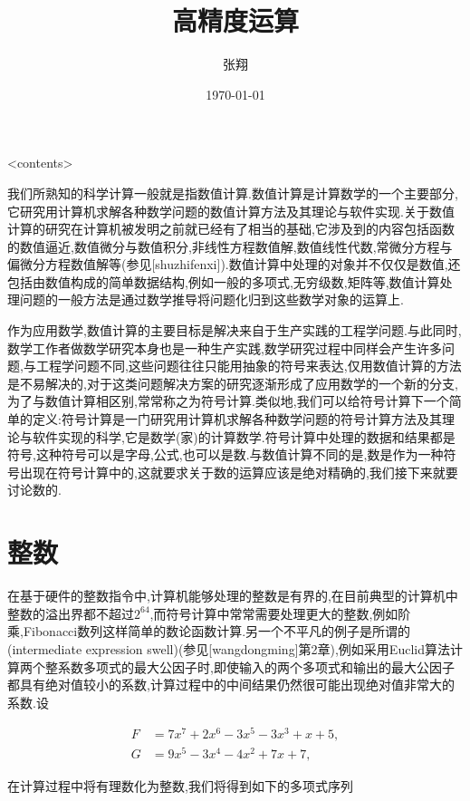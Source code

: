 \documentclass{ctexart}
\title{高精度运算}
\author{张翔}
\date{\today}
\newcommand\mtcasCite[1]{[#1]}
\begin{document}
\maketitle

<contents>

我们所熟知的科学计算一般就是指数值计算.数值计算是计算数学的一个主要部分,它研究用计算机求解各种数学问题的数值计算方法及其理论与软件实现.关于数值计算的研究在计算机被发明之前就已经有了相当的基础,它涉及到的内容包括函数的数值逼近,数值微分与数值积分,非线性方程数值解,数值线性代数,常微分方程与偏微分方程数值解等(参见\mtcasCite{shuzhifenxi}).数值计算中处理的对象并不仅仅是数值,还包括由数值构成的简单数据结构,例如一般的多项式,无穷级数,矩阵等,数值计算处理问题的一般方法是通过数学推导将问题化归到这些数学对象的运算上.

作为应用数学,数值计算的主要目标是解决来自于生产实践的工程学问题.与此同时,数学工作者做数学研究本身也是一种生产实践,数学研究过程中同样会产生许多问题,与工程学问题不同,这些问题往往只能用抽象的符号来表达,仅用数值计算的方法是不易解决的,对于这类问题解决方案的研究逐渐形成了应用数学的一个新的分支,为了与数值计算相区别,常常称之为符号计算.类似地,我们可以给符号计算下一个简单的定义:符号计算是一门研究用计算机求解各种数学问题的符号计算方法及其理论与软件实现的科学,它是数学(家)的计算数学.符号计算中处理的数据和结果都是符号,这种符号可以是字母,公式,也可以是数.与数值计算不同的是,数是作为一种符号出现在符号计算中的,这就要求关于数的运算应该是绝对精确的,我们接下来就要讨论数的.

\section{整数}

在基于硬件的整数指令中,计算机能够处理的整数是有界的,在目前典型的计算机中整数的溢出界都不超过$2^{64}$,而符号计算中常常需要处理更大的整数,例如阶乘,Fibonacci数列这样简单的数论函数计算.另一个不平凡的例子是所谓的(intermediate expression swell)(参见\mtcasCite{wangdongming}第2章),例如采用Euclid算法计算两个整系数多项式的最大公因子时,即使输入的两个多项式和输出的最大公因子都具有绝对值较小的系数,计算过程中的中间结果仍然很可能出现绝对值非常大的系数.设

\begin{align*}
  F&=7x^7+2x^6-3x^5-3x^3+x+5,\\
G&=9x^5-3x^4-4x^2+7x+7,
\end{align*}

在计算过程中将有理数化为整数,我们将得到如下的多项式序列
\end{document}
